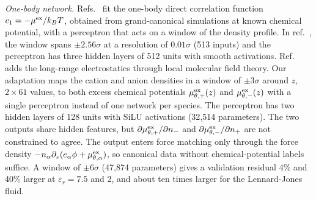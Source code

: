 \textit{One-body network.} Refs.~\cite{sammuller2023neural,bui2025learning} fit the one-body direct correlation function $c_1=-\mu^{\rm ex}/k_BT$, obtained from grand-canonical simulations at known chemical potential, with a perceptron that acts on a window of the density profile. In ref.~\cite{sammuller2023neural}, the window spans $\pm2.56\sigma$ at a resolution of $0.01\sigma$ (513 inputs) and the perceptron has three hidden layers of 512 units with smooth activations. Ref.~\cite{bui2025learning} adds the long-range electrostatics through local molecular field theory.
Our adaptation maps the cation and anion densities in a window of $\pm3\sigma$ around $z$, $2\times61$ values, to both excess chemical potentials $\mu^{\rm ex}_{\theta,+}(z)$ and $\mu^{\rm ex}_{\theta,-}(z)$ with a single perceptron instead of one network per species. The perceptron has two hidden layers of 128 units with SiLU activations (32{,}514 parameters). The two outputs share hidden features, but $\partial\mu^{\rm ex}_{\theta,+}/\partial n_-$ and $\partial\mu^{\rm ex}_{\theta,-}/\partial n_+$ are not constrained to agree. The output enters force matching only through the force density $-n_\alpha\partial_z(e_\alpha\phi+\mu^{\rm ex}_{\theta,\alpha})$, so canonical data without chemical-potential labels suffice. A window of $\pm6\sigma$ (47{,}874 parameters) gives a validation residual 4\% and 40\% larger at $\varepsilon_r=7.5$ and $2$, and about ten times larger for the Lennard-Jones fluid.

